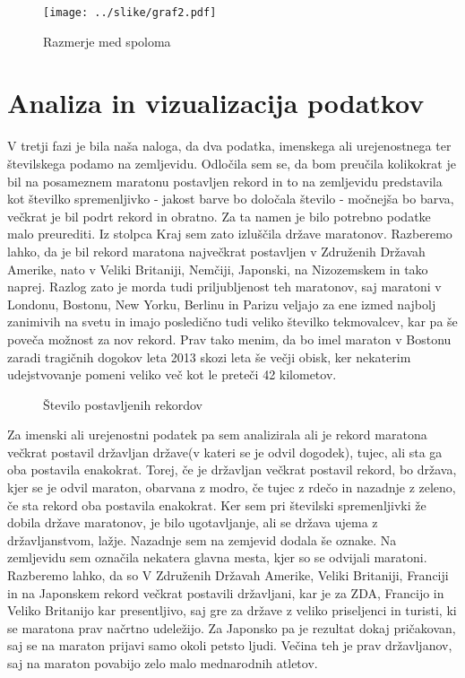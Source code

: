 \documentclass[11pt,a4paper]{article}
\begin{document}
\begin{figure}[H]
  \texttt{[image: ../slike/graf2.pdf]}
  \caption{Razmerje med spoloma}
  \label{fig:Slika 2}
\end{figure}

\newpage
\section{Analiza in vizualizacija podatkov}

V tretji fazi je bila naša naloga, da dva podatka, imenskega ali urejenostnega ter številskega podamo na zemljevidu. 
Odločila sem se, da bom preučila kolikokrat je bil na posameznem maratonu postavljen rekord in to na zemljevidu predstavila kot številko spremenljivko - jakost barve bo določala število - močnejša bo barva, večkrat je bil podrt rekord in obratno. Za ta namen je bilo potrebno podatke malo preurediti. Iz stolpca Kraj sem zato izluščila države maratonov. 
Razberemo lahko, da je bil rekord maratona največkrat postavljen v Združenih Državah Amerike, nato v Veliki Britaniji, Nemčiji, Japonski, na Nizozemskem in tako naprej. Razlog zato je morda tudi priljubljenost teh maratonov, saj maratoni v Londonu, Bostonu, New Yorku, Berlinu in Parizu veljajo za ene izmed najbolj zanimivih na svetu in imajo posledično tudi veliko številko tekmovalcev, kar pa še poveča možnost za nov rekord. Prav tako menim, da bo imel maraton v Bostonu zaradi tragičnih dogokov leta 2013 skozi leta še večji obisk, ker nekaterim udejstvovanje pomeni veliko več kot le preteči 42 kilometov.

\begin{figure}[H]
  \caption{Število postavljenih rekordov}
  \label{fig:Zemljevid 1}
\end{figure}

Za imenski ali urejenostni podatek pa sem analizirala ali je rekord maratona večkrat postavil državljan države(v kateri se je odvil dogodek), tujec, ali sta ga oba postavila enakokrat. Torej, če je državljan večkrat postavil rekord, bo država, kjer se je odvil maraton, obarvana z modro, če tujec z rdečo in nazadnje z zeleno, če sta rekord oba postavila enakokrat.
Ker sem pri številski spremenljivki že dobila države maratonov, je bilo ugotavljanje, ali se država ujema z državljanstvom, lažje.
Nazadnje sem na zemjevid dodala še oznake. Na zemljevidu sem označila nekatera glavna mesta, kjer so se odvijali maratoni.
Razberemo lahko, da so V Združenih Državah Amerike, Veliki Britaniji, Franciji in na Japonskem rekord večkrat postavili državljani, kar je za ZDA, Francijo in Veliko Britanijo kar presentljivo, saj gre za države z veliko priseljenci in turisti, ki se maratona prav načrtno udeležijo. 
Za Japonsko pa je rezultat dokaj pričakovan, saj se na maraton prijavi samo okoli petsto ljudi. Večina teh je prav državljanov, saj na maraton povabijo zelo malo mednarodnih atletov.
\end{document}
